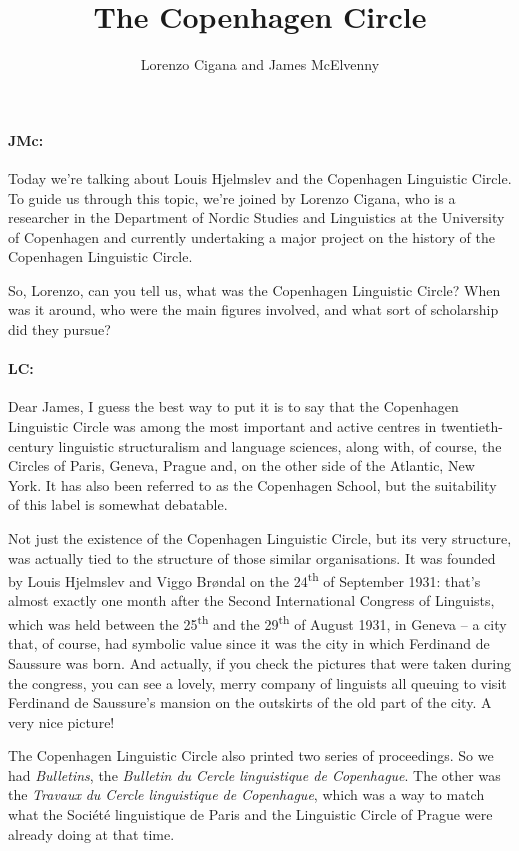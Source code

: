 \documentclass[output=paper]{langscibook}
\author{Lorenzo Cigana\orcid{}\affiliation{University of Copenhagen} and James McElvenny\affiliation{University of Siegen}}
\title{The Copenhagen Circle}
\begin{document}
\maketitle


\paragraph*{JMc:} Today we’re talking about Louis Hjelmslev and the Copenhagen Linguistic Circle. To guide us through this topic, we’re joined by Lorenzo Cigana, who is a researcher in the Department of Nordic Studies and Linguistics at the University of Copenhagen and currently undertaking a major project on the history of the Copenhagen Linguistic Circle.

So, Lorenzo, can you tell us, what was the Copenhagen Linguistic Circle? When was it around, who were the main figures involved, and what sort of scholarship did they pursue?

\paragraph*{LC:} Dear James, I guess the best way to put it is to say that the Copenhagen Linguistic Circle was among the most important and active centres in twentieth{}-century linguistic structuralism and language sciences, along with, of course, the Circles of Paris, Geneva, Prague and, on the other side of the Atlantic, New York. It has also been referred to as the Copenhagen School, but the suitability of this label is somewhat debatable.

Not just the existence of the Copenhagen Linguistic Circle, but its very structure, was actually tied to the structure of those similar organisations. It was founded by Louis Hjelmslev and Viggo Brøndal on the 24\textsuperscript{th} of  September 1931: that’s almost exactly one month after the Second International Congress of Linguists, which was held between the 25\textsuperscript{th} and the 29\textsuperscript{th} of  August 1931, in Geneva – a city that, of course, had symbolic value since it was the city in which Ferdinand de Saussure was born. And actually, if you check the pictures that were taken during the congress, you can see a lovely, merry company of linguists all queuing to visit Ferdinand de Saussure’s mansion on the outskirts of the old part of the city. A very nice picture!

The Copenhagen Linguistic Circle also printed two series of proceedings. So we had \textit{Bulletins}, the \textit{Bulletin du Cercle linguistique de Copenhague}. The other was the \textit{Travaux} \textit{du Cercle linguistique de Copenhague}, which was a way to match what the Société linguistique de Paris and the Linguistic Circle of Prague were already doing at that time. 
\end{document}
